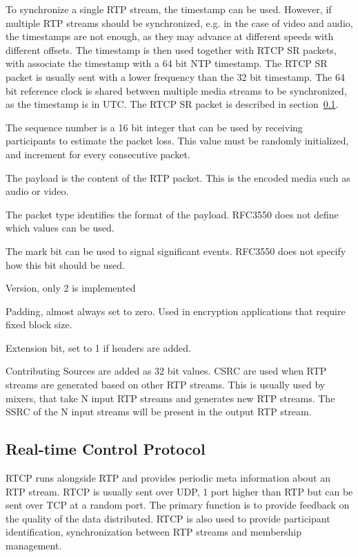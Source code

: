 To synchronize a single RTP stream, the timestamp can be used. However, if multiple RTP streams should be synchronized, e.g. in the case of video and audio, the timestamps are not enough, as they may advance at different speeds with different offsets. The timestamp is then used together with RTCP SR packets, with associate the timestamp with a 64 bit NTP timestamp. The RTCP SR packet is usually sent with a lower frequency than the 32 bit timestamp. The 64 bit reference clock is shared between multiple media streams to be synchronized, as the timestamp is in \ac{UTC}. The RTCP SR packet is described in section~\ref{sec:design:rtcp}.


The sequence number is a 16 bit integer that can be used by receiving participants to estimate the packet loss. This value must be randomly initialized, and increment for every consecutive packet.

The payload is the content of the RTP packet. This is the encoded media such as audio or video. 

The packet type identifies the format of the payload. RFC3550 does not define which values can be used.


The mark bit can be used to signal significant events. RFC3550 does not specify how this bit should be used.

Version, only 2 is implemented

Padding, almost always set to zero. Used in encryption applications that require fixed block size.

Extension bit, set to 1 if headers are added.

Contributing Sources are added as 32 bit values. CSRC are used when RTP streams are generated based on other RTP streams. This is usually used by mixers, that take N input RTP streams and generates new RTP streams. The SSRC of the N input streams will be present in the output RTP stream.

\subsection{Real-time Control Protocol} \label{sec:design:rtcp}
RTCP runs alongside RTP and provides periodic meta information about an RTP stream. RTCP is usually sent over UDP, 1 port higher than RTP but can be sent over TCP at a random port. The primary function is to provide feedback on the quality of the data distributed. RTCP is also used to provide participant identification, synchronization between RTP streams and membership management.\\

